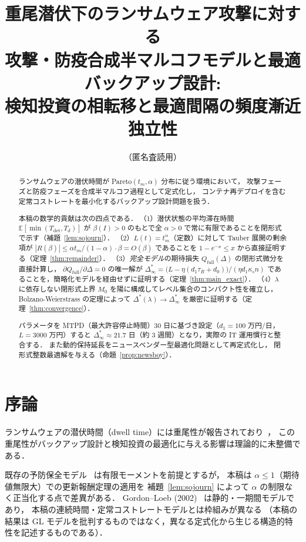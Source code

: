 \documentclass[12pt,a4paper]{article}
\theoremstyle{plain}
\theoremstyle{definition}
\theoremstyle{remark}
\newcommand{\E}{\mathbb{E}}
\newcommand{\Qf}{Q_{\mathrm{full}}}
\newcommand{\Tdet}{T_{\mathrm{det}}}
\newcommand{\betaI}{\beta(I)}
\newcommand{\Dopt}{\Delta^{*}}
\newcommand{\Dinf}{\Delta^{*}_{\infty}}
\begin{document}
\title{重尾潜伏下のランサムウェア攻撃に対する\\
攻撃・防疫合成半マルコフモデルと最適バックアップ設計:\\
検知投資の相転移と最適間隔の頻度漸近独立性}
\author{（匿名査読用）}
\date{}
\maketitle

\begin{abstract}
ランサムウェアの潜伏時間が Pareto$(t_m,\alpha)$ 分布に従う環境において，
攻撃フェーズと防疫フェーズを合成半マルコフ過程として定式化し，
コンテナ再デプロイを含む定常コストレートを最小化するバックアップ設計問題を扱う．

本稿の数学的貢献は次の四点である．
（1）潜伏状態の平均滞在時間 $\E[\min(\Tdet,T_d)]$ が
$\betaI>0$ のもとで全 $\alpha>0$ で常に有限であることを閉形式で示す（補題~\ref{lem:sojourn}）．
（2）$L(t)=t_m^\alpha$（定数）に対して
Tauber 展開の剰余項が $|R(\beta)|\le\alpha t_m/(1-\alpha)\cdot\beta=O(\beta)$
であることを $1-e^{-x}\le x$ から直接証明する（定理~\ref{thm:remainder}）．
（3）\emph{完全モデル}の期待損失 $\Qf(\Delta)$ の閉形式微分を直接計算し，
$\partial\Qf/\partial\Delta=0$ の唯一解が $\Dinf=\bigl(L-\eta(d_1\tau_R+d_0)\bigr)/(\eta d_1\kappa_s n)$
であることを，簡略化モデルを経由せずに証明する（定理~\ref{thm:main_exact}）．
（4）$\lambda$ に依存しない閉形式上界 $M_0$ を陽に構成してレベル集合のコンパクト性を確立し，
Bolzano-Weierstrass の定理によって $\Dopt(\lambda)\to\Dinf$ を厳密に証明する（定理~\ref{thm:convergence}）．

パラメータを MTPD（最大許容停止時間）30 日に基づき設定（$d_1=100$ 万円/日，$L=3000$ 万円）すると
$\Dinf\approx 21.7$ 日（約 3 週間）となり，実際の IT 運用慣行と整合する．
また動的保持延長をニュースベンダー型最適化問題として再定式化し，
閉形式整数最適解を与える（命題~\ref{prop:newsboy}）．
\end{abstract}

\tableofcontents
\newpage

\section{序論}
\label{sec:intro}

ランサムウェアの潜伏時間（dwell time）には重尾性が報告されており~\cite{mandiant2023,ibm2023,gruber2022}，
この重尾性がバックアップ設計と検知投資の最適化に与える影響は理論的に未整備である．

既存の予防保全モデル~\cite{barlow1965,nakagawa2005} は有限モーメントを前提とするが，
本稿は $\alpha\le1$（期待値無限大）での更新報酬定理の適用を
補題~\ref{lem:sojourn} によって $\alpha$ の制限なく正当化する点で差異がある．
Gordon--Loeb (2002)~\cite{gordon2002} は静的・一期間モデルであり，
本稿の連続時間・定常コストレートモデルとは枠組みが異なる
（本稿の結果は GL モデルを批判するものではなく，異なる定式化から生じる構造的特性を記述するものである）．
\end{document}
